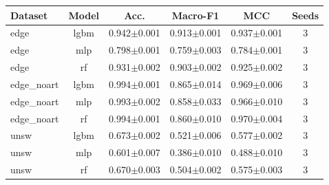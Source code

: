 \begin{tabular}{lccccc}
\toprule
Dataset & Model & Acc. & Macro-F1 & MCC & Seeds \\
\midrule
edge & lgbm & 0.942$\pm$0.001 & 0.913$\pm$0.001 & 0.937$\pm$0.001 & 3 \\
edge & mlp & 0.798$\pm$0.001 & 0.759$\pm$0.003 & 0.784$\pm$0.001 & 3 \\
edge & rf & 0.931$\pm$0.002 & 0.903$\pm$0.002 & 0.925$\pm$0.002 & 3 \\
edge_noart & lgbm & 0.994$\pm$0.001 & 0.865$\pm$0.014 & 0.969$\pm$0.006 & 3 \\
edge_noart & mlp & 0.993$\pm$0.002 & 0.858$\pm$0.033 & 0.966$\pm$0.010 & 3 \\
edge_noart & rf & 0.994$\pm$0.001 & 0.860$\pm$0.010 & 0.970$\pm$0.004 & 3 \\
unsw & lgbm & 0.673$\pm$0.002 & 0.521$\pm$0.006 & 0.577$\pm$0.002 & 3 \\
unsw & mlp & 0.601$\pm$0.007 & 0.386$\pm$0.010 & 0.488$\pm$0.010 & 3 \\
unsw & rf & 0.670$\pm$0.003 & 0.504$\pm$0.002 & 0.575$\pm$0.003 & 3 \\
\bottomrule
\end{tabular}


